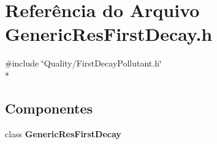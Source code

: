 \section{Referência do Arquivo Generic\+Res\+First\+Decay.\+h}
\label{_generic_res_first_decay_8h}
{\ttfamily \#include \char`\"{}Quality/\+First\+Decay\+Pollutant.\+h\char`\"{}}\\*
\subsection*{Componentes}
\begin{DoxyCompactItemize}
\item 
class {\bf Generic\+Res\+First\+Decay}
\end{DoxyCompactItemize}
